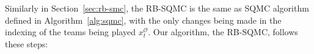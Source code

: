 Similarly in Section~\ref{sec:rb-smc}, the RB-SQMC is the same as SQMC algorithm defined in Algorithm~\ref{alg:sqmc}, with the only changes being made in the indexing of the teams being played $x_t^{\mathcal{O}}$. Our algorithm, the RB-SQMC, follows these steps:










